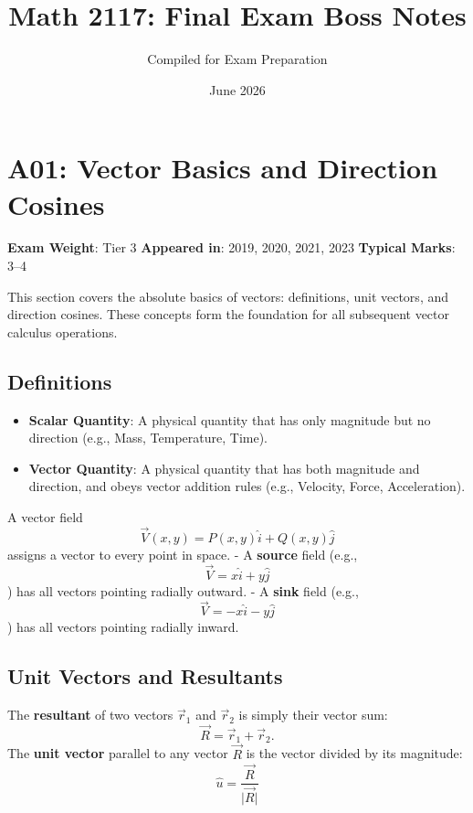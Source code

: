 \documentclass[
]{article}
\title{Math 2117: Final Exam Boss Notes}
\author{Compiled for Exam Preparation}
\date{June 2026}
\providecommand{\tightlist}{%
  \setlength{\itemsep}{0pt}\setlength{\parskip}{0pt}}
\renewenvironment{quote}
  {\begin{tcolorbox}[
     colback=calloutbg,
     colframe=calloutframe,
     colupper=callouttext,
     arc=3pt,
     boxrule=0.5pt,
     leftrule=0.5pt,
     borderline west={3pt}{0pt}{calloutaccent},
     left=8pt,
     right=8pt,
     top=6pt,
     bottom=6pt
   ]}
  {\end{tcolorbox}}
\begin{document}
\maketitle

{
\setcounter{tocdepth}{3}
\tableofcontents
}

\section{A01: Vector Basics and Direction
Cosines}\label{a01-vector-basics-and-direction-cosines}

\begin{quote}
\textbf{Exam Weight}: Tier 3 \textbar{} \textbf{Appeared in}: 2019,
2020, 2021, 2023 \textbar{} \textbf{Typical Marks}: 3--4
\end{quote}

This section covers the absolute basics of vectors: definitions, unit
vectors, and direction cosines. These concepts form the foundation for
all subsequent vector calculus operations.

\subsection{Definitions}\label{definitions}

\begin{itemize}
\tightlist
\item
  \textbf{Scalar Quantity}: A physical quantity that has only magnitude
  but no direction (e.g., Mass, Temperature, Time).
\item
  \textbf{Vector Quantity}: A physical quantity that has both magnitude
  and direction, and obeys vector addition rules (e.g., Velocity, Force,
  Acceleration).
\end{itemize}

A vector field
\[
\vec{V}(x, y) = P(x, y)\hat{i} + Q(x, y)\hat{j}
\]
assigns a vector to every point in space. - A \textbf{source} field
(e.g.,
\[
\vec{V} = x\hat{i} + y\hat{j}
\]
) has all vectors pointing radially outward. - A \textbf{sink} field
(e.g.,
\[
\vec{V} = -x\hat{i} - y\hat{j}
\]
) has all vectors pointing radially inward.

\subsection{Unit Vectors and
Resultants}\label{unit-vectors-and-resultants}

The \textbf{resultant} of two vectors \(\vec{r}_1\) and \(\vec{r}_2\) is
simply their vector sum:
\[
\vec{R} = \vec{r}_1 + \vec{r}_2.
\]
The \textbf{unit vector} parallel to any vector \(\vec{R}\) is the
vector divided by its magnitude:
\[
\hat{u} = \frac{\vec{R}}{\lvert \vec{R} \rvert}
\]
\end{document}
